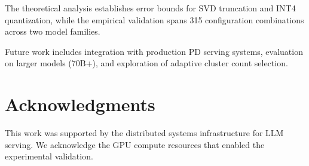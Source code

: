\documentclass[11pt, a4paper, oneside]{article}
\theoremstyle{myplain}
\theoremstyle{mydefinition}
\theoremstyle{myremark}
\begin{document}
The theoretical analysis establishes error bounds for SVD truncation and INT4 quantization, while the empirical validation spans 315 configuration combinations across two model families.

Future work includes integration with production PD serving systems, evaluation on larger models (70B+), and exploration of adaptive cluster count selection.

\section*{Acknowledgments}

This work was supported by the distributed systems infrastructure for LLM serving. We acknowledge the GPU compute resources that enabled the experimental validation.


\end{document}
